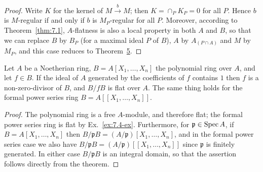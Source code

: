 \begin{proof}
Write $K$ for the kernel of $M \xrightarrow{b} M$; then $K = \cap_P K_P = 0$ for all $P$.
Hence $b$ is $M$-regular if and only if $b$ is $M_P$-regular for all $P$. Moreover,
according to Theorem~\ref{thm:7.1}, $A$-flatness is also a local property in both $A$
and $B$, so that we can replace $B$ by $B_P$ (for a maximal ideal $P$ of $B$), $A$ by
$A_{(P \cap A)}$ and $M$ by $M_P$, and this case reduces to Theorem~\hyperref[thm:22.5]{5}.
\end{proof}

\begin{corollary*}
Let $A$ be a Noetherian ring, $B = A[X_1, \ldots, X_n]$ the polynomial ring over
$A$, and let $f \in B$. If the ideal of $A$ generated by the coefficients of $f$
contains $1$ then $f$ is a non-zero-divisor of $B$, and $B/fB$ is flat over $A$.
The same thing holds for the formal power series ring $B = A[[X_1, \ldots, X_n]]$.
\end{corollary*}

\begin{proof}
The polynomial ring is a free $A$-module, and therefore flat; the formal power
series ring is flat by Ex.~\ref{ex:7.4-ex}. Furthermore, for $\mathfrak{p} \in \operatorname{Spec} A$, if
$B = A[X_1, \ldots, X_n]$ then $B/\mathfrak{p}B = (A/\mathfrak{p})[X_1, \ldots, X_n]$, and in the formal
power series case we also have $B/\mathfrak{p}B = (A/\mathfrak{p})[[X_1, \ldots, X_n]]$ since
$\mathfrak{p}$ is finitely generated. In either case $B/\mathfrak{p}B$ is an integral domain,
so that the assertion follows directly from the theorem.
\end{proof}

